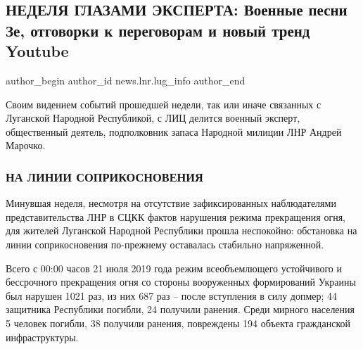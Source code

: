 
 
 
 
 
 
\subsection{НЕДЕЛЯ ГЛАЗАМИ ЭКСПЕРТА: Военные песни Зе, отговорки к переговорам и новый тренд Youtube}
\label{sec:06_02_2022.stz.news.lnr.lug_info.1.marochko_nedelja}
 
\ifcmt
 author_begin
   author_id news.lnr.lug_info
 author_end
\fi

Своим видением событий прошедшей недели, так или иначе связанных с Луганской
Народной Республикой, с ЛИЦ делится военный эксперт, общественный деятель,
подполковник запаса Народной милиции ЛНР Андрей Марочко.


\subsubsection{НА ЛИНИИ СОПРИКОСНОВЕНИЯ}

Минувшая неделя, несмотря на отсутствие зафиксированных наблюдателями
представительства ЛНР в СЦКК фактов нарушения режима прекращения огня, для
жителей Луганской Народной Республики прошла неспокойно: обстановка на линии
соприкосновения по-прежнему оставалась стабильно напряженной.

Всего с 00:00 часов 21 июля 2019 года режим всеобъемлющего устойчивого и
бессрочного прекращения огня со стороны вооруженных формирований Украины был
нарушен 1021 раз, из них 687 раз – после вступления в силу допмер; 44 защитника
Республики погибли, 24 получили ранения. Среди мирного населения 5 человек
погибли, 38 получили ранения, повреждены 194 объекта гражданской
инфраструктуры.

